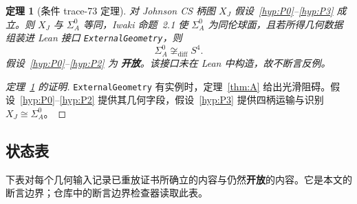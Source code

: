 \documentclass[11pt]{amsart}
\newtheorem{theorem}{定理}[section]
\theoremstyle{definition}
\theoremstyle{remark}
\newcommand{\Open}{\textbf{开放}}
\begin{document}
\begin{theorem}[条件 trace-73 定理]\label{thm:joined}
对 Johnson CS 柄图 $X_J$ 假设~\ref{hyp:P0}--\ref{hyp:P3} 成立。则 $X_J$ 与 $\Sigma_A^0$ 等同，Iwaki 命题~2.1 使 $\Sigma_A^0$ 为同伦球面，且若所得几何数据组装进 Lean 接口 \texttt{ExternalGeometry}，则
\[
\Sigma_A^0\not\cong_{\mathrm{diff}}S^4.
\]
假设~\ref{hyp:P0}--\ref{hyp:P2} 为 \Open。该接口未在 Lean 中构造，故不断言反例。
\end{theorem}

\begin{proof}[定理~\ref{thm:joined} 的证明]
\texttt{ExternalGeometry} 有实例时，定理~\ref{thm:A} 给出光滑阻碍。假设~\ref{hyp:P0}--\ref{hyp:P2} 提供其几何字段，假设~\ref{hyp:P3} 提供四柄运输与识别 $X_J\cong\Sigma_A^0$。
\end{proof}

\subsection{状态表}\label{sec:status-table}

下表对每个几何输入记录已重放证书所确立的内容与仍然\Open 的内容。它是本文的断言边界；仓库中的断言边界检查器读取此表。
\end{document}
